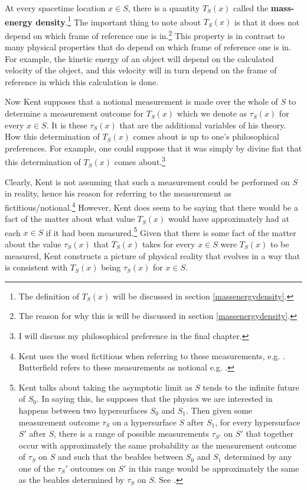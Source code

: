 \documentclass[12pt]{report}
\begin{document}
At every spacetime location $x\in S$, there is a quantity $T_S(x)$\label{firstTS}  
called the \label{massenergydensity}\textbf{mass-energy density}.\footnote{The definition of $T_S(x)$ will be discussed in section \ref{massenergydensity}.} The important thing to note about $T_S(x)$ is that it does not depend on which frame of reference one is in.\footnote{The reason for why this is will be discussed in section \ref{massenergydensity}.}
  This property is in contrast to many physical properties that do depend on which frame of reference one is in. For example, the kinetic energy of an object will depend on the calculated velocity of the object, and this velocity will in turn depend on the frame of reference in which this calculation is done. 

Now Kent supposes that a notional measurement is made over the whole of $S$ to determine a measurement outcome for $T_S(x)$ which we denote as $\tau_S(x)$ for every $x\in S$.  It is these $\tau_S(x)$ that are the additional variables of his theory. How this determination of $T_S(x)$ comes about is up to one's philosophical preferences. For example, one could suppose that it was simply by divine fiat that this determination  of $T_S(x)$ comes about.\footnote{I will discuss my philosophical preference in the final chapter.} 
 

Clearly,  Kent is not assuming that such a measurement could be performed on $S$ in reality, hence his reason for referring to the measurement as fictitious/notional.\footnote{Kent uses the word fictitious when referring to these measurements, e.g. \cite[3]{Kent2014}. Butterfield refers to these measurements as notional e.g. \cite[17]{Butterfield}.} However, Kent does seem to be saying that there would be a fact of the matter about what value $T_S(x)$ would have approximately had at each $x\in S$ if it had been measured.\footnote{\label{asymptoticfootnote}Kent talks about taking the asymptotic limit as $S$ tends to the infinite future of $S_0$. In saying this, he supposes that the physics we are interested in happens between two hypersurfaces $S_0$ and $S_1$. Then given some measurement outcome $\tau_S$ on a hypersurface $S$ after $S_1$, for every hypersurface $S'$ after $S$, there is a range of possible measurements $\tau_{S'}$ on $S'$ that together occur with approximately the same probability as the measurement outcome of $\tau_S$ on $S$ and such that the beables between $S_0$ and $S_1$ determined by any one of the $\tau_S'$ outcomes on $S'$ in this range would be approximately the same as the beables determined by $\tau_S$ on $S$. See \cite[3]{Kent2014}.} Given that there is some fact of the matter about the value $\tau_S(x)$ that $T_S(x)$ takes for every $x\in S$ were $T_S(x)$ to be measured, Kent constructs a picture of physical reality that evolves in a way that is consistent with $T_S(x)$ being $\tau_S(x)$ for $x\in S$. 
\end{document}
